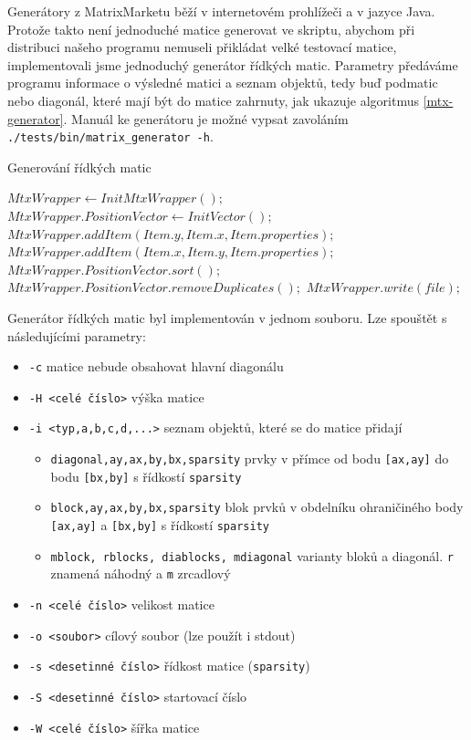\documentclass[thesis=B,czech]{FITthesis}[2012/06/26]
\begin{document}
Generátory z MatrixMarketu běží v internetovém prohlížeči a v jazyce Java. Protože takto není jednoduché matice generovat ve skriptu, abychom při distribuci našeho programu nemuseli přikládat velké testovací matice, implementovali jsme jednoduchý generátor řídkých matic. Parametry předáváme programu informace o výsledné matici a seznam objektů, tedy buď podmatic nebo diagonál, které mají být do matice zahrnuty, jak ukazuje algoritmus \ref{mtx-generator}. Manuál ke generátoru je možné vypsat zavoláním \texttt{./tests/bin/matrix\_generator -h}.    

\begin{algorithm}[H]
	\caption{Generování řídkých matic}\label{mtx-generator}
	\begin{algorithmic}[1]
		\State \texttt{$MtxWrapper \gets InitMtxWrapper();$}
		\State \texttt{$MtxWrapper.PositionVector \gets InitVector();$}	
			\State \texttt{$MtxWrapper.addItem(Item.y, Item.x, Item.properties);$}
				\State \texttt{$MtxWrapper.addItem(Item.x, Item.y, Item.properties);$}
			\EndIf
		\EndFor
		\State \texttt{$MtxWrapper.PositionVector.sort();$}
		\State \texttt{$MtxWrapper.PositionVector.removeDuplicates();$}
		\State \texttt{$MtxWrapper.write(file);$}
		\EndProcedure
	\end{algorithmic}
\end{algorithm}

Generátor řídkých matic byl implementován v jednom souboru. Lze spouštět s následujícími parametry:

\begin{itemize}
	\item \texttt{-c} matice nebude obsahovat hlavní diagonálu
 	\item \texttt{-H <celé číslo>} výška matice
 	\item \texttt{-i <typ,a,b,c,d,...>} seznam objektů, které se do matice přidají
 	\begin{itemize}
 	\item \texttt{diagonal,ay,ax,by,bx,sparsity} prvky v přímce od bodu \texttt{[ax,ay]} do bodu \texttt{[bx,by]} s řídkostí \texttt{sparsity}
 	\item \texttt{block,ay,ax,by,bx,sparsity} blok prvků v obdelníku ohraničiného body \texttt{[ax,ay]} a \texttt{[bx,by]} s  řídkostí \texttt{sparsity}
 	\item \texttt{mblock, rblocks, diablocks, mdiagonal} varianty bloků a diagonál. \texttt{r} znamená náhodný a \texttt{m} zrcadlový
 	\end{itemize}
 	\item \texttt{-n <celé číslo>} velikost matice
 	\item \texttt{-o <soubor>} cílový soubor (lze použít i stdout)
 	\item \texttt{-s <desetinné číslo>} řídkost matice (\texttt{sparsity})
 	\item \texttt{-S <desetinné číslo>} startovací číslo
 	\item \texttt{-W <celé číslo>} šířka matice
 \end{itemize}
 
\end{document}
